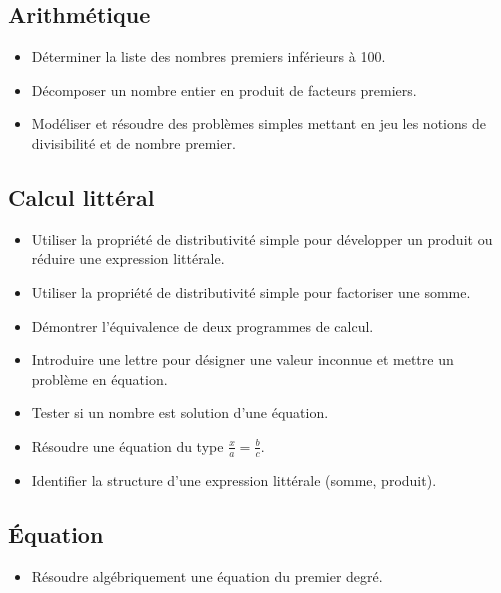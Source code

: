\documentclass[a4paper,12pt,fleqn]{article}	
\begin{document}
\subsection*{Arithmétique}

\begin{itemize}
	\item {}Déterminer la liste des nombres premiers inférieurs à 100.
	\item {}Décomposer un nombre entier en produit de facteurs premiers.
	\item {}Modéliser et résoudre des problèmes simples mettant en jeu les notions de divisibilité et de nombre premier.
\end{itemize}

\subsection*{Calcul littéral}

\begin{itemize}
	\item {}Utiliser la propriété de distributivité simple pour développer un produit ou réduire une expression littérale.
	\item {}Utiliser la propriété de distributivité simple pour factoriser une somme.
	\item {}Démontrer l’équivalence de deux programmes de calcul.
	\item {}Introduire une lettre pour désigner une valeur inconnue et mettre un problème en équation.
	\item {}Tester si un nombre est solution d’une équation.
	\item {}Résoudre une équation du type $\frac{x}{a}=\frac{b}{c}$.
	\item {}Identifier la structure d’une expression littérale (somme, produit).
\end{itemize}

\subsection*{Équation}

\begin{itemize}
	\item {}Résoudre algébriquement une équation du premier degré.
\end{itemize}
	
\end{document}
